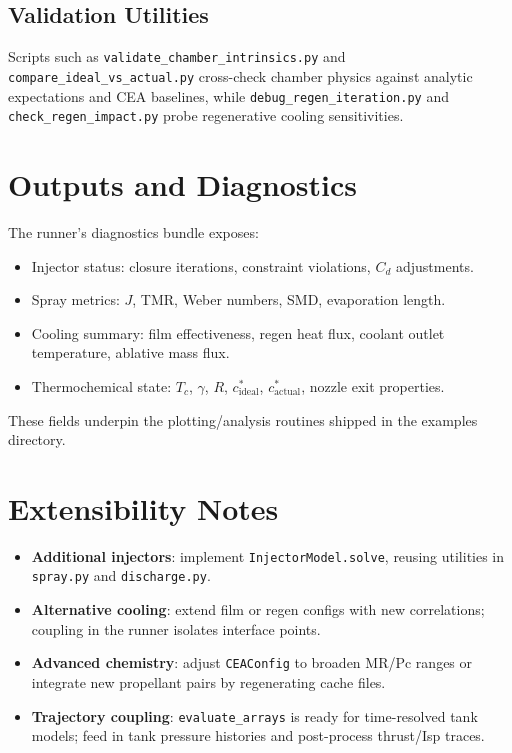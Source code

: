 \documentclass[12pt]{article}
\begin{document}
\subsection{Validation Utilities}
Scripts such as \verb|validate_chamber_intrinsics.py| and \verb|compare_ideal_vs_actual.py| cross-check chamber physics against analytic expectations and CEA baselines, while \verb|debug_regen_iteration.py| and \verb|check_regen_impact.py| probe regenerative cooling sensitivities.

\section{Outputs and Diagnostics}

The runner's diagnostics bundle exposes:
\begin{itemize}
    \item Injector status: closure iterations, constraint violations, $C_d$ adjustments.
    \item Spray metrics: $J$, TMR, Weber numbers, SMD, evaporation length.
    \item Cooling summary: film effectiveness, regen heat flux, coolant outlet temperature, ablative mass flux.
    \item Thermochemical state: $T_c$, $\gamma$, $R$, $c^*_{\text{ideal}}$, $c^*_{\text{actual}}$, nozzle exit properties.
\end{itemize}
These fields underpin the plotting/analysis routines shipped in the examples directory.

\section{Extensibility Notes}

\begin{itemize}
    \item \textbf{Additional injectors}: implement \verb|InjectorModel.solve|, reusing utilities in \verb|spray.py| and \verb|discharge.py|.
    \item \textbf{Alternative cooling}: extend film or regen configs with new correlations; coupling in the runner isolates interface points.
    \item \textbf{Advanced chemistry}: adjust \verb|CEAConfig| to broaden MR/Pc ranges or integrate new propellant pairs by regenerating cache files.
    \item \textbf{Trajectory coupling}: \verb|evaluate_arrays| is ready for time-resolved tank models; feed in tank pressure histories and post-process thrust/Isp traces.
\end{itemize}
\end{document}
